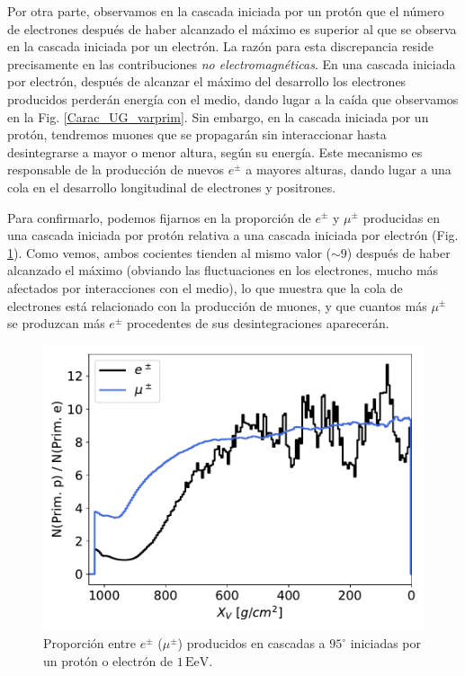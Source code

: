 \documentclass[11 pt, a4paper]{article} %
\numberwithin{equation}{section}
\numberwithin{figure}{section}
\numberwithin{table}{section}
\begin{document}
Por otra parte, observamos en la cascada iniciada por un protón que el número de electrones después de haber alcanzado el máximo es superior al que se observa en la cascada iniciada por un electrón. La razón para esta discrepancia reside precisamente en las contribuciones \textit{no electromagnéticas}. En una cascada iniciada por electrón, después de alcanzar el máximo del desarrollo los electrones producidos perderán energía con el medio, dando lugar a la caída que observamos en la Fig. \ref{Carac_UG_varprim}. Sin embargo, en la cascada iniciada por un protón, tendremos muones que se propagarán sin interaccionar hasta desintegrarse a mayor o menor altura, según su energía. Este mecanismo es responsable de la producción de nuevos $e^\pm$ a mayores alturas, dando lugar a una cola en el desarrollo longitudinal de electrones y positrones.

Para confirmarlo, podemos fijarnos en la proporción de $e^\pm$ y $\mu^\pm$ producidas en una cascada iniciada por protón relativa a una cascada iniciada por electrón (Fig. \ref{frac_primpe}). Como vemos, ambos cocientes tienden al mismo valor ($\sim 9$) después de haber alcanzado el máximo (obviando las fluctuaciones en los electrones, mucho más afectados por interacciones con el medio), lo que muestra que la cola de electrones está relacionado con la producción de muones, y que cuantos más $\mu^\pm$ se produzcan más $e^\pm$ procedentes de sus desintegraciones aparecerán.
\begin{figure}[H]
	\centering
	\includegraphics[width=.5\linewidth]{figures/cascadas/frac_emu_Primpe}
	\caption{Proporción entre $e^\pm$ ($\mu^\pm$) producidos en cascadas a $95^\circ$ iniciadas por un protón o electrón de $1\,\mathrm{EeV}$.}
	\label{frac_primpe}
\end{figure}
\end{document}

